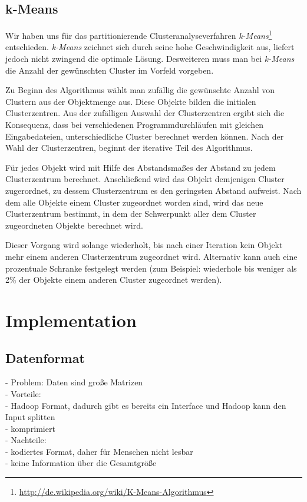\documentclass[a4paper]{llncs}
\begin{document}
\subsection{k-Means}
Wir haben uns für das partitionierende Clusteranalyseverfahren \emph{k-Means}\footnote{\url{http://de.wikipedia.org/wiki/K-Means-Algorithmus}} entschieden. \emph{k-Means} zeichnet sich durch seine hohe Geschwindigkeit aus, liefert jedoch nicht zwingend die optimale Lösung. Desweiteren muss man bei \emph{k-Means} die Anzahl der gewünschten Cluster im Vorfeld vorgeben.

Zu Beginn des Algorithmus wählt man zufällig die gewünschte Anzahl von Clustern aus der Objektmenge aus. Diese Objekte bilden die initialen Clusterzentren. Aus der zufälligen Auswahl der Clusterzentren ergibt sich die Konsequenz, dass bei verschiedenen Programmdurchläufen mit gleichen Eingabedateien, unterschiedliche Cluster berechnet werden können. Nach der Wahl der Clusterzentren, beginnt der iterative Teil des Algorithmus.

Für jedes Objekt wird mit Hilfe des Abstandsmaßes der Abstand zu jedem Clusterzentrum berechnet. Anschließend wird das Objekt demjenigen Cluster zugerordnet, zu dessem Clusterzentrum es den geringsten Abstand aufweist. Nach dem alle Objekte einem Cluster zugeordnet worden sind, wird das neue Clusterzentrum bestimmt, in dem der Schwerpunkt aller dem Cluster zugeordneten Objekte berechnet wird.

Dieser Vorgang wird solange wiederholt, bis nach einer Iteration kein Objekt mehr einem anderen Clusterzentrum zugeordnet wird. Alternativ kann auch eine prozentuale Schranke festgelegt werden (zum Beispiel: wiederhole bis weniger als 2\% der Objekte einem anderen Cluster zugeordnet werden).

\section{Implementation}

\subsection{Datenformat}
- Problem: Daten sind große Matrizen\\
- Vorteile:\\
    - Hadoop Format, dadurch gibt es bereits ein Interface und Hadoop kann den Input splitten\\
    - komprimiert\\
- Nachteile:\\
    - kodiertes Format, daher für Menschen nicht lesbar\\
    - keine Information über die Gesamtgröße
\end{document}
